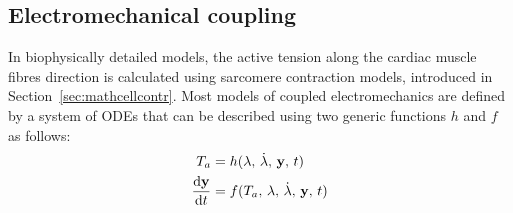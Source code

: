 






%
%
%
\subsection{Electromechanical coupling}\label{sec:mathelecmechcoupl}
In biophysically detailed models, the active tension along the cardiac muscle fibres direction is calculated using sarcomere contraction models, introduced in Section~\ref{sec:mathcellcontr}. Most models of coupled electromechanics are defined by a system of ODEs that can be described using two generic functions $h$ and $f$ as follows:
%
\begin{align}
    T_a &= h(\lambda,\,\dot{\lambda},\,\mathbf{y},\,t) \label{eq:eq5} \\
    \dfrac{\mathrm{d}{\mathbf{y}}}{\mathrm{d}{t}} &= f(T_a,\,\lambda,\,\dot{\lambda},\,\mathbf{y},\,t) \label{eq:eq6}
\end{align}

